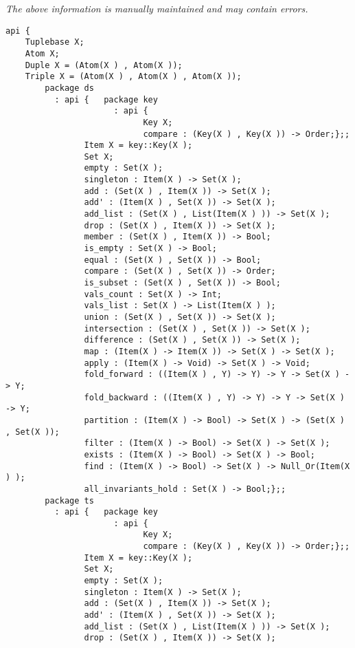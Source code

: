 \label{api:Tuplebasex}

{\tiny \it The above information is manually maintained and may contain errors.}
\begin{verbatim}
api {
    Tuplebase X;
    Atom X;
    Duple X = (Atom(X ) , Atom(X ));
    Triple X = (Atom(X ) , Atom(X ) , Atom(X ));
        package ds
          : api {   package key
                      : api {
                            Key X;
                            compare : (Key(X ) , Key(X )) -> Order;};;
                Item X = key::Key(X );
                Set X;
                empty : Set(X );
                singleton : Item(X ) -> Set(X );
                add : (Set(X ) , Item(X )) -> Set(X );
                add' : (Item(X ) , Set(X )) -> Set(X );
                add_list : (Set(X ) , List(Item(X ) )) -> Set(X );
                drop : (Set(X ) , Item(X )) -> Set(X );
                member : (Set(X ) , Item(X )) -> Bool;
                is_empty : Set(X ) -> Bool;
                equal : (Set(X ) , Set(X )) -> Bool;
                compare : (Set(X ) , Set(X )) -> Order;
                is_subset : (Set(X ) , Set(X )) -> Bool;
                vals_count : Set(X ) -> Int;
                vals_list : Set(X ) -> List(Item(X ) );
                union : (Set(X ) , Set(X )) -> Set(X );
                intersection : (Set(X ) , Set(X )) -> Set(X );
                difference : (Set(X ) , Set(X )) -> Set(X );
                map : (Item(X ) -> Item(X )) -> Set(X ) -> Set(X );
                apply : (Item(X ) -> Void) -> Set(X ) -> Void;
                fold_forward : ((Item(X ) , Y) -> Y) -> Y -> Set(X ) -> Y;
                fold_backward : ((Item(X ) , Y) -> Y) -> Y -> Set(X ) -> Y;
                partition : (Item(X ) -> Bool) -> Set(X ) -> (Set(X ) , Set(X ));
                filter : (Item(X ) -> Bool) -> Set(X ) -> Set(X );
                exists : (Item(X ) -> Bool) -> Set(X ) -> Bool;
                find : (Item(X ) -> Bool) -> Set(X ) -> Null_Or(Item(X ) );
                all_invariants_hold : Set(X ) -> Bool;};;
        package ts
          : api {   package key
                      : api {
                            Key X;
                            compare : (Key(X ) , Key(X )) -> Order;};;
                Item X = key::Key(X );
                Set X;
                empty : Set(X );
                singleton : Item(X ) -> Set(X );
                add : (Set(X ) , Item(X )) -> Set(X );
                add' : (Item(X ) , Set(X )) -> Set(X );
                add_list : (Set(X ) , List(Item(X ) )) -> Set(X );
                drop : (Set(X ) , Item(X )) -> Set(X );

\end{verbatim}
